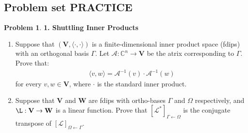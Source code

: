 \documentclass{article}
\theoremstyle{definition}
\newtheorem*{prob*}{Problem}
\newcommand{\V}{\mathbf{V}}
\newcommand{\W}{\mathbf{W}}
\newcommand{\A}{\mathcal{A}}
\newcommand{\lag}{\mathcal{L}}
\newcommand{\la}{\langle}
\newcommand{\ra}{\rangle}
\begin{document}
\newpage












































\subsection{Problem set PRACTICE}

\begin{prob*}\textbf{1. Shuttling Inner Products}
	\begin{enumerate}
		\item Suppose that $\left( \V, \la \cdot, \cdot\ra \right)$ is a finite-dimensional inner product space (fdips) with an orthogonal basis $\Gamma$. Let $\A : \mathbb{C}^n \to \V$ be the atrix corresponding to $\Gamma$. Prove that:
		\begin{align*}
		\la v,w \ra = \A^{-1}(v) \cdot \A^{-1}(w)
		\end{align*}
		for every $v,w\in \V$, where $\cdot$ is the standard inner product. 
		
		
		
		
		
		\item Suppose that $\V$ and $\W$ are fdips with ortho-bases $\Gamma$ and $\Omega$ respectively, and $\L : \V \to \W$ is a linear function. Prove that $[\lag^*]_{\Gamma\leftarrow\Omega}$ is the conjugate transpose of $[\lag]_{\Omega\leftarrow\Gamma}$.
	\end{enumerate}
	
\end{prob*}
\end{document}
